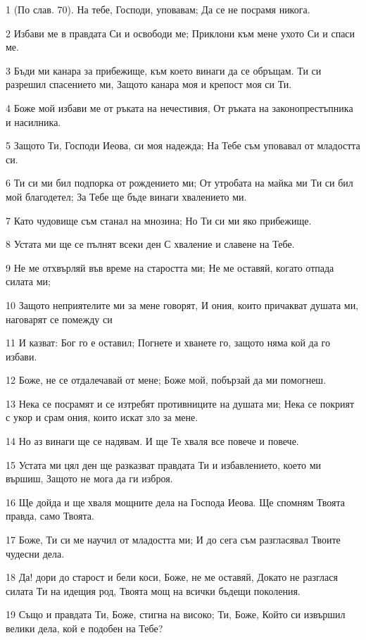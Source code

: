 \par 1 (По слав. 70). На тебе, Господи, уповавам; Да се не посрамя никога.
\par 2 Избави ме в правдата Си и освободи ме; Приклони към мене ухото Си и спаси ме.
\par 3 Бъди ми канара за прибежище, към което винаги да се обръщам. Ти си разрешил спасението ми, Защото канара моя и крепост моя си Ти.
\par 4 Боже мой избави ме от ръката на нечестивия, От ръката на законопрестъпника и насилника.
\par 5 Защото Ти, Господи Иеова, си моя надежда; На Тебе съм уповавал от младостта си.
\par 6 Ти си ми бил подпорка от рождението ми; От утробата на майка ми Ти си бил мой благодетел; За Тебе ще бъде винаги хвалението ми.
\par 7 Като чудовище съм станал на мнозина; Но Ти си ми яко прибежище.
\par 8 Устата ми ще се пълнят всеки ден С хваление и славене на Тебе.
\par 9 Не ме отхвърляй във време на старостта ми; Не ме оставяй, когато отпада силата ми;
\par 10 Защото неприятелите ми за мене говорят, И ония, които причакват душата ми, наговарят се помежду си
\par 11 И казват: Бог го е оставил; Погнете и хванете го, защото няма кой да го избави.
\par 12 Боже, не се отдалечавай от мене; Боже мой, побързай да ми помогнеш.
\par 13 Нека се посрамят и се изтребят противниците на душата ми; Нека се покрият с укор и срам ония, които искат зло за мене.
\par 14 Но аз винаги ще се надявам. И ще Те хваля все повече и повече.
\par 15 Устата ми цял ден ще разказват правдата Ти и избавлението, което ми вършиш, Защото не мога да ги изброя.
\par 16 Ще дойда и ще хваля мощните дела на Господа Иеова. Ще спомням Твоята правда, само Твоята.
\par 17 Боже, Ти си ме научил от младостта ми; И до сега съм разгласявал Твоите чудесни дела.
\par 18 Да! дори до старост и бели коси, Боже, не ме оставяй, Докато не разглася силата Ти на идещия род, Твоята мощ на всички бъдещи поколения.
\par 19 Също и правдата Ти, Боже, стигна на високо; Ти, Боже, Който си извършил велики дела, кой е подобен на Тебе?
